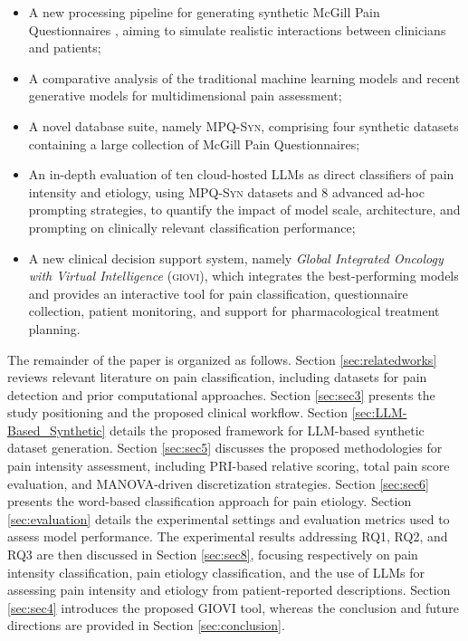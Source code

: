 \documentclass[preprint,12pt,authoryear]{elsarticle}
\newcommand{\system}{\small\textsc{giovi}\xspace}
\newcommand{\dbsuite}{\small\textsc{MPQ-Syn}\xspace}
\begin{document}
\begin{itemize}[leftmargin=10pt]
\item A new processing pipeline for generating synthetic McGill Pain Questionnaires \citep{melzack2005mcgill}, aiming to simulate realistic interactions between clinicians and patients;
\item A comparative analysis of the traditional machine learning models and recent generative models for multidimensional pain assessment;
\item A novel database suite, namely \dbsuite, comprising four synthetic datasets containing a large collection of McGill Pain Questionnaires;

\item An in-depth evaluation of ten cloud-hosted LLMs as direct classifiers of pain intensity and etiology, using \dbsuite datasets and 8 advanced ad-hoc prompting strategies, to quantify the impact of model scale, architecture, and prompting on clinically relevant classification performance;
\item A new clinical decision support system, namely \textit{Global Integrated Oncology with Virtual Intelligence} (\system), which integrates the best-performing models and provides an interactive tool for pain classification, questionnaire collection, patient monitoring, and support for pharmacological treatment planning.
\end{itemize}

The remainder of the paper is organized as follows. Section \ref{sec:relatedworks} reviews relevant literature on pain classification, including datasets for pain detection and prior computational approaches. Section \ref{sec:sec3} presents the study positioning and the proposed clinical workflow. Section \ref{sec:LLM-Based_Synthetic} details the proposed framework for LLM-based synthetic dataset generation. Section \ref{sec:sec5} discusses the proposed methodologies for pain intensity assessment, including PRI-based relative scoring, total pain score evaluation, and MANOVA-driven discretization strategies. Section \ref{sec:sec6} presents the word-based classification approach for pain etiology. Section \ref{sec:evaluation} details the experimental settings and evaluation metrics used to assess model performance. The experimental results addressing RQ1, RQ2, and RQ3 are then discussed in Section \ref{sec:sec8}, focusing respectively on pain intensity classification, pain etiology classification, and the use of LLMs for assessing pain intensity and etiology from patient-reported descriptions. Section \ref{sec:sec4} introduces the proposed GIOVI tool, whereas the conclusion and future directions are provided in Section \ref{sec:conclusion}.
\end{document}
